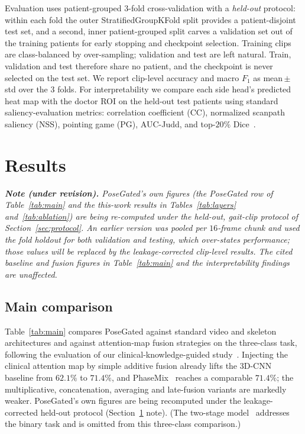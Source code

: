 \documentclass[review,authoryear,times]{elsarticle}
\begin{document}
Evaluation uses patient-grouped $3$-fold cross-validation with a \emph{held-out}
protocol: within each fold the outer StratifiedGroupKFold split provides a
patient-disjoint test set, and a second, inner patient-grouped split carves a
validation set out of the training patients for early stopping and checkpoint
selection. Training clips are class-balanced by over-sampling; validation and
test are left natural. Train, validation and test therefore share no patient, and
the checkpoint is never selected on the test set. We report clip-level accuracy
and macro $F_1$ as mean\,$\pm$\,std over the $3$ folds. For interpretability we
compare each side head's predicted heat map with the doctor ROI on the held-out
test patients using standard saliency-evaluation metrics: correlation coefficient
(CC), normalized scanpath saliency (NSS), pointing game (PG), AUC-Judd, and
top-$20\%$ Dice~\citep{bylinskii2019metrics}.

\section{Results}
\label{sec:results}

\noindent\emph{\textbf{Note (under revision).} PoseGated's own figures (the
PoseGated row of Table~\ref{tab:main} and the this-work results in
Tables~\ref{tab:layers} and~\ref{tab:ablation}) are being re-computed under the
held-out, gait-clip protocol of Section~\ref{sec:protocol}. An earlier version was
pooled per $16$-frame chunk and used the fold holdout for both validation and
testing, which over-states performance; those values will be replaced by the
leakage-corrected clip-level results. The cited baseline and fusion figures in
Table~\ref{tab:main} and the interpretability findings are unaffected.}

\subsection{Main comparison}
Table~\ref{tab:main} compares PoseGated against standard video and skeleton
architectures and against attention-map fusion strategies on the three-class
task, following the evaluation of our clinical-knowledge-guided
study~\citep{chen2025clinicalgait}. Injecting the clinical attention map by simple
additive fusion already lifts the 3D-CNN baseline from $62.1\%$ to $71.4\%$, and
PhaseMix~\citep{chen2024phasemix} reaches a comparable $71.4\%$; the multiplicative,
concatenation, averaging and late-fusion variants are markedly weaker. PoseGated's
own figures are being recomputed under the leakage-corrected held-out protocol
(Section~\ref{sec:results} note). (The two-stage model~\citep{chen2023two} addresses
the binary task and is omitted from this three-class comparison.)
\end{document}
